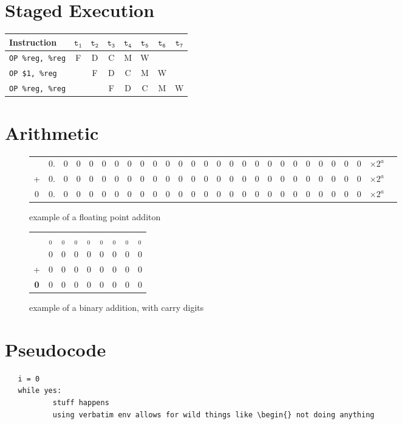 \documentclass{article}
\begin{document}
\section{Staged Execution}
\begin{table}[h]
   \centering
   \begin{tabular}{l|ccccccc}
   Instruction & $\mathtt{t_1}$ &$\mathtt{t_2}$ &$\mathtt{t_3}$ &$\mathtt{t_4}$ &$\mathtt{t_5}$ &$\mathtt{t_6}$ &$\mathtt{t_7}$ \\
   \hline
   \texttt{OP   \%reg, \%reg} & F & D & C & M & W\\
   \texttt{OP   \$1, \%reg} & & F & D & C & M & W\\
   \texttt{OP  \%reg, \%reg} & & & F & D & C & M & W
   \end{tabular}
\end{table}


\section{Arithmetic}
\begin{figure}[h]
   \centering
   \begin{tabular}{c*{27}{@{\enspace}c}}
      &0.&0&0&0&0&0&0&0&0&0&0&0&0&0&0&0&0&0&0&0&0&0&0&0&0& $\times 2^{a}$\\
      +&0.&0&0&0&0&0&0&0&0&0&0&0&0&0&0&0&0&0&0&0&0&0&0&0&0& $\times 2^{a}$\\
      &0.&0&0&0&0&0&0&0&0&0&0&0&0&0&0&0&0&0&0&0&0&0&0&0&0&$\times 2^{a}$
   \end{tabular}
   \caption{example of a floating point additon}

   \begin{tabular}{c*{8}{@{\enspace}c}}
      & $_{0}$ & $_{0}$ & $_{0}$ & $_{0}$ & $_{0}$ & $_{0}$ & $_{0}$ & $_{0}$\\ %
      & 0 & 0 & 0 & 0 & 0 & 0 & 0 & 0\\
    + & 0 & 0 & 0 & 0 & 0 & 0 & 0 & 0\\
    \hline
    \textbf{0} & 0 & 0 & 0 & 0 & 0 & 0 & 0 & 0\\
   \end{tabular}
   \caption{example of a binary addition, with carry digits}


\end{figure}

\section{Pseudocode}
\begin{verbatim}
   i = 0
   while yes:
           stuff happens
           using verbatim env allows for wild things like \begin{} not doing anything
   
\end{verbatim}
\end{document}
